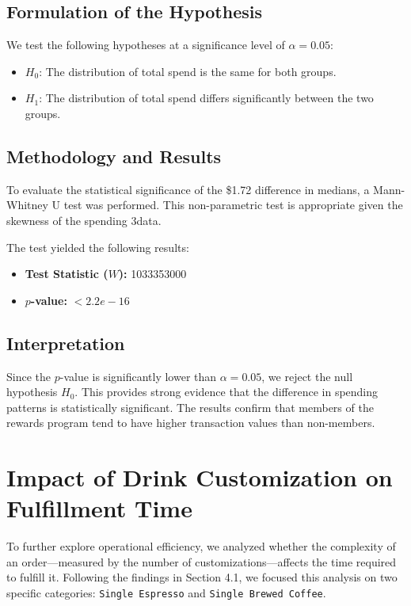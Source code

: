 \documentclass[12pt]{report}
\begin{document}
\subsection{Formulation of the Hypothesis}
We test the following hypotheses at a significance level of \(\alpha = 0.05\):
\begin{itemize}
    \item \(H_0\): The distribution of total spend is the same for both groups.
    \item \(H_1\): The distribution of total spend differs significantly between the two groups.
\end{itemize}

\subsection{Methodology and Results}
To evaluate the statistical significance of the \$1.72 difference in medians, a Mann-Whitney U test was performed. This non-parametric test is appropriate given the skewness of the spending 3data.

The test yielded the following results:
\begin{itemize}
    \item \textbf{Test Statistic (\(W\)):} 1033353000
    \item \textbf{\(p\)-value:} \(< 2.2e-16\)
\end{itemize}

\subsection{Interpretation}
Since the \(p\)-value is significantly lower than \(\alpha = 0.05\), we reject the null hypothesis \(H_0\). This provides strong evidence that the difference in spending patterns is statistically significant. The results confirm that members of the rewards program tend to have higher transaction values than non-members.


\section{Impact of Drink Customization on Fulfillment Time}
To further explore operational efficiency, we analyzed whether the complexity of an order---measured by the number of customizations---affects the time required to fulfill it. Following the findings in Section 4.1, we focused this analysis on two specific categories: \texttt{Single Espresso} and \texttt{Single Brewed Coffee}.
\end{document}
